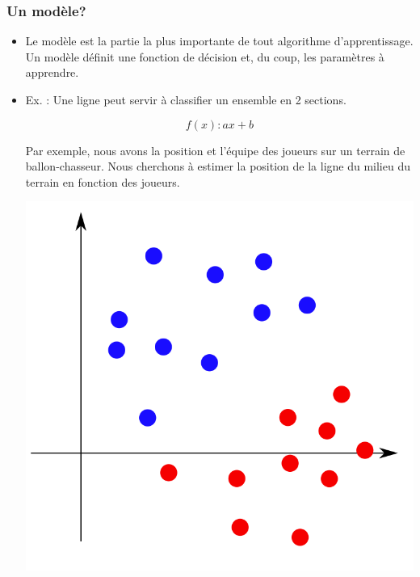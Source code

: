\documentclass[french]{beamer}
\begin{document}
\begin{frame}
\frametitle{Un modèle?}
\begin{itemize}
\item Le modèle est la partie la plus importante de tout algorithme d'apprentissage. Un modèle définit une fonction de décision et, du coup, les paramètres à apprendre.

\item Ex. : Une ligne peut servir à classifier un ensemble en 2 sections. 

	$$f(x): ax + b$$

Par exemple, nous avons la position et l'équipe des joueurs sur un terrain de ballon-chasseur. Nous cherchons à estimer la position de la ligne du milieu du terrain en fonction des joueurs.
\begin{center}
\includegraphics[scale=0.2]{ballon-chasseur.png}
\end{center}

\end{itemize}

\end{frame}
\end{document}
